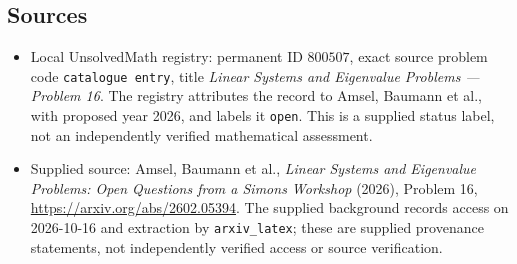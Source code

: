 \documentclass[11pt]{article}
\begin{document}
\subsection{Sources}
\begin{itemize}
\item Local UnsolvedMath registry: permanent ID \(800507\), exact source problem code \texttt{catalogue entry}, title \emph{Linear Systems and Eigenvalue Problems --- Problem 16}. The registry attributes the record to Amsel, Baumann et al., with proposed year 2026, and labels it \texttt{open}. This is a supplied status label, not an independently verified mathematical assessment.
\item Supplied source: Amsel, Baumann et al., \emph{Linear Systems and Eigenvalue Problems: Open Questions from a Simons Workshop} (2026), Problem 16, \url{https://arxiv.org/abs/2602.05394}. The supplied background records access on 2026-10-16 and extraction by \texttt{arxiv\_latex}; these are supplied provenance statements, not independently verified access or source verification.
\end{itemize}
\end{document}

